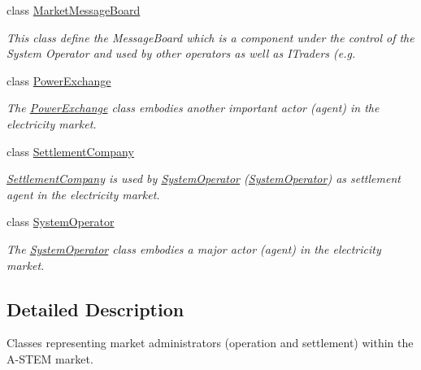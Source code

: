 \begin{DoxyCompactItemize}
\item 
class \hyperlink{classuk_1_1ac_1_1dmu_1_1iesd_1_1cascade_1_1market_1_1astem_1_1operators_1_1_market_message_board}{Market\-Message\-Board}
\begin{DoxyCompactList}\small\item\em This class define the Message\-Board which is a component under the control of the System Operator and used by other operators as well as I\-Traders (e.\-g. \end{DoxyCompactList}\item 
class \hyperlink{classuk_1_1ac_1_1dmu_1_1iesd_1_1cascade_1_1market_1_1astem_1_1operators_1_1_power_exchange}{Power\-Exchange}
\begin{DoxyCompactList}\small\item\em The {\itshape \hyperlink{classuk_1_1ac_1_1dmu_1_1iesd_1_1cascade_1_1market_1_1astem_1_1operators_1_1_power_exchange}{Power\-Exchange}} class embodies another important actor (agent) in the electricity market. \end{DoxyCompactList}\item 
class \hyperlink{classuk_1_1ac_1_1dmu_1_1iesd_1_1cascade_1_1market_1_1astem_1_1operators_1_1_settlement_company}{Settlement\-Company}
\begin{DoxyCompactList}\small\item\em {\itshape \hyperlink{classuk_1_1ac_1_1dmu_1_1iesd_1_1cascade_1_1market_1_1astem_1_1operators_1_1_settlement_company}{Settlement\-Company}} is used by {\itshape \hyperlink{classuk_1_1ac_1_1dmu_1_1iesd_1_1cascade_1_1market_1_1astem_1_1operators_1_1_system_operator}{System\-Operator}} (\hyperlink{classuk_1_1ac_1_1dmu_1_1iesd_1_1cascade_1_1market_1_1astem_1_1operators_1_1_system_operator}{System\-Operator}) as settlement agent in the electricity market. \end{DoxyCompactList}\item 
class \hyperlink{classuk_1_1ac_1_1dmu_1_1iesd_1_1cascade_1_1market_1_1astem_1_1operators_1_1_system_operator}{System\-Operator}
\begin{DoxyCompactList}\small\item\em The {\itshape \hyperlink{classuk_1_1ac_1_1dmu_1_1iesd_1_1cascade_1_1market_1_1astem_1_1operators_1_1_system_operator}{System\-Operator}} class embodies a major actor (agent) in the electricity market. \end{DoxyCompactList}\end{DoxyCompactItemize}


\subsection{Detailed Description}
Classes representing market administrators (operation and settlement) within the A-\/\-S\-T\-E\-M market. 